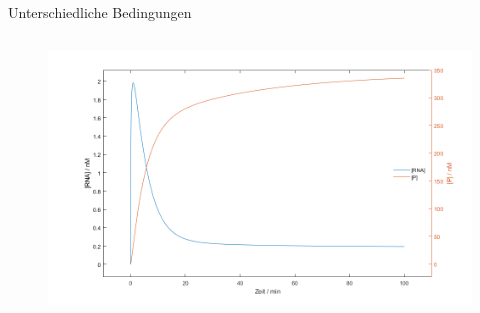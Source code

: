 \documentclass[11pt,aspectratio=169,reqno]{beamer}
\begin{document}
\begin{frame}{Unterschiedliche Bedingungen}
\begin{columns}
        \begin{figure}
            \centering
            \includegraphics[width=\linewidth]{images/simulations/negative_autoregulation_low_affinity.m.png}
        \end{figure}
    \end{columns}


\end{frame}
\end{document}
